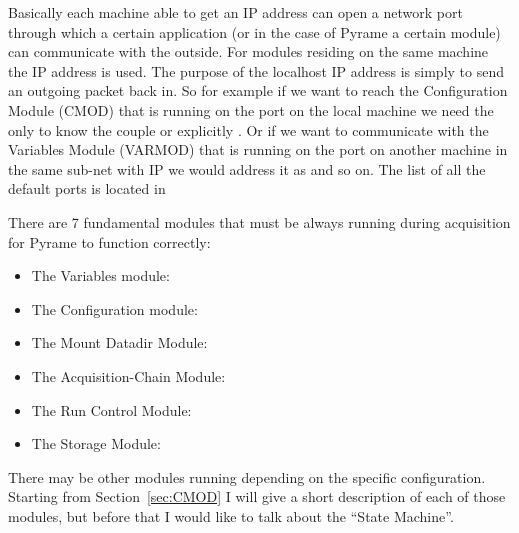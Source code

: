 Basically each machine able to get an IP address can open a network
port through which a certain application (or in the case of Pyrame a
certain module) can communicate with the outside. For modules residing
on the same machine the  IP address is
used. The purpose of the localhost IP address is simply to send an
outgoing packet back in. So for example if we want to reach the
Configuration Module (CMOD) that is running on the port
 on the local machine we need the only to
know the couple  or explicitly
. Or if we want to communicate with the
Variables Module (VARMOD) that is running on the port
 on another machine in the same sub-net
with IP  we would address it as
 and so on.  The list of all the
default ports is located in 

There are 7 fundamental modules that must be always running during
acquisition for Pyrame to function correctly:
\begin{itemize}
\item The Variables module: 
\item The Configuration module: 
\item The Mount Datadir Module: 
\item The Acquisition-Chain Module: 
\item The Run Control Module: 
\item The Storage Module: 
\end{itemize}
There may be other modules running depending on the specific
configuration. Starting from Section~\ref{sec:CMOD} I will give a
short description of each of those modules, but before that I would
like to talk about the ``State Machine''.


